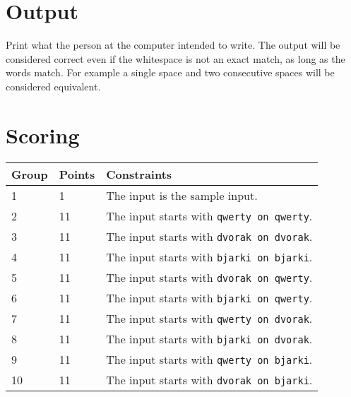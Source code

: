 \section*{Output}
Print what the person at the computer intended to write. The output will be considered correct even if the
whitespace is not an exact match, as long as the words match. For example a single space and two consecutive spaces
will be considered equivalent.

\section*{Scoring}
\begin{tabular}{|l|l|l|}
\hline
Group & Points & Constraints \\ \hline
1     & 1    & The input is the sample input. \\ \hline
2     & 11   & The input starts with \texttt{qwerty on qwerty}. \\ \hline
3     & 11   & The input starts with \texttt{dvorak on dvorak}. \\ \hline
4     & 11   & The input starts with \texttt{bjarki on bjarki}. \\ \hline
5     & 11   & The input starts with \texttt{dvorak on qwerty}. \\ \hline
6     & 11   & The input starts with \texttt{bjarki on qwerty}. \\ \hline
7     & 11   & The input starts with \texttt{qwerty on dvorak}. \\ \hline
8     & 11   & The input starts with \texttt{bjarki on dvorak}. \\ \hline
9     & 11   & The input starts with \texttt{qwerty on bjarki}. \\ \hline
10    & 11   & The input starts with \texttt{dvorak on bjarki}. \\ \hline
\end{tabular}
